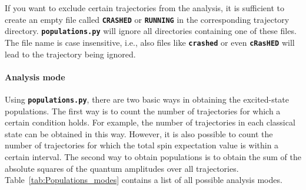 \documentclass[a4paper,11pt,DIV=15,openany,twoside=false]{scrbook}
\newcommand{\ttt}[1]{\textbf{\texttt{#1}}}
\begin{document}
If you want to exclude certain trajectories from the analysis, it is sufficient to create an empty file called \ttt{CRASHED} or \ttt{RUNNING} in the corresponding trajectory directory. \ttt{populations.py} will ignore all directories containing one of these files. The file name is case insensitive, i.e., also files like \ttt{crashed} or even \ttt{cRasHED} will lead to the trajectory being ignored.

\paragraph{Analysis mode}

Using \ttt{populations.py}, there are two basic ways in obtaining the excited-state populations. The first way is to count the number of trajectories for which a certain condition holds. For example, the number of trajectories in each classical state can be obtained in this way. However, it is also possible to count the number of trajectories for which the total spin expectation value is within a certain interval. 
The second way to obtain populations is to obtain the sum of the absolute squares of the quantum amplitudes over all trajectories. Table~\ref{tab:Populations_modes} contains a list of all possible analysis modes.
\end{document}
